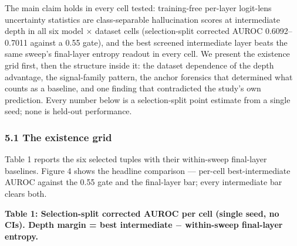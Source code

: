 
The main claim holds in every cell tested: training-free per-layer logit-lens uncertainty statistics are class-separable hallucination scores at intermediate depth in all six model $\times$ dataset cells (selection-split corrected AUROC 0.6092--0.7011 against a 0.55 gate), and the best screened intermediate layer beats the same sweep's final-layer entropy readout in every cell. We present the existence grid first, then the structure inside it: the dataset dependence of the depth advantage, the signal-family pattern, the anchor forensics that determined what counts as a baseline, and one finding that contradicted the study's own prediction. Every number below is a selection-split point estimate from a single seed; none is held-out performance.

\subsubsection{5.1 The existence grid}

Table 1 reports the six selected tuples with their within-sweep final-layer baselines. Figure 4 shows the headline comparison --- per-cell best-intermediate AUROC against the 0.55 gate and the final-layer bar; every intermediate bar clears both.

\textbf{Table 1: Selection-split corrected AUROC per cell (single seed, no CIs). Depth margin = best intermediate $-$ within-sweep final-layer entropy.}

\begin{table}[htbp]
\centering
{}
\end{table}

